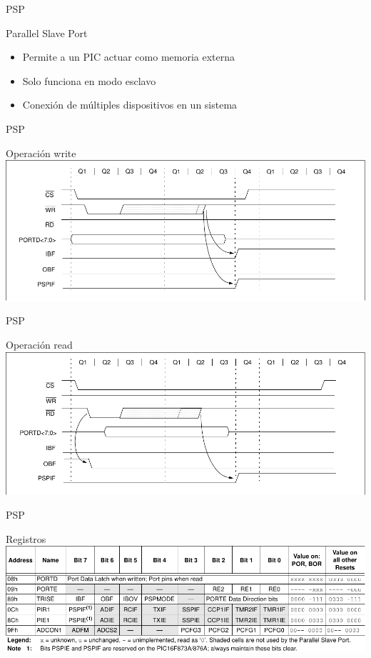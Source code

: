 \documentclass[xcolor=dvipsnames, handout]{beamer}
\begin{document}
\begin{frame}{PSP}
  \begin{block}{Parallel Slave Port}
    \begin{itemize}[<+->]
      \item Permite a un PIC actuar como memoria externa
      \item Solo funciona en modo esclavo
      \item Conexión de múltiples dispositivos en un sistema
    \end{itemize}
  \end{block}  
\end{frame}

\begin{frame}{PSP}
  \begin{block}{Operación write}
    \includegraphics[width=\textwidth]{psp-write}
  \end{block}
\end{frame}

\begin{frame}{PSP}
  \begin{block}{Operación read}
    \includegraphics[width=\textwidth]{psp-read.pdf}
  \end{block}
\end{frame}

\begin{frame}{PSP}
  \begin{block}{Registros}
    \includegraphics[width=\textwidth]{psp-regs}
  \end{block}
\end{frame}
\end{document}
